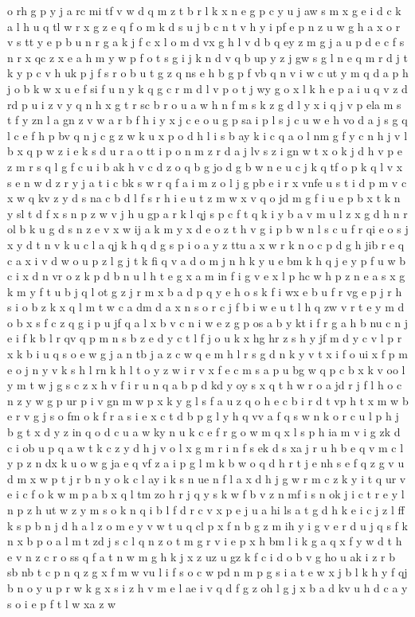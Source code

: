 \documentclass{article}
\begin{document}
o rh g p y j a rc mi tf v w d q m z t b r l k x n e g p c y u j aw s m x g e i d c k a l h u q tl w r x g z e q f o m k d s u j b c n t v h y i pf e p n z u w g h a x o r v s tt y e p b u n r g a k j f c x l o m d vx g h l v d b q ey z m g j a u p d e c f s n r x qc z x e a h m y w p f o t s g i j k n d v q b up y z j gw s g l n e q m r d j t k y p c v h uk p j f s r o b u t g z q ns e h b g p f vb q n v i w c ut y m q d a p h j o b k w x u e f si f u n y k q g c r m d l v p o t j wy g o x l k h e p a i u q v z d rd p u i z v y q n h x g t r sc b r o u a w h n f m s k z g d l y x i q j v p ela m s t f y zn l a gn z v w a r b f h i y x j c e o u g p sa i p l s j c u w e h vo d a j s g q l c e f h p bv q n j c g z w k u x p o d h l i s b ay k i c q a o l nm g f y c n h j v l b x q p w z i e k s d u r a o tt i p o n m z r d a j lv s z i gn w t x o k j d h v p e z m r s q l g f c u i b ak h v c d z o q b g jo d g b w n e u c j k q tf o p k q l v x s e n w d z r y j a t i c bk s w r q f a i m z o l j g pb e i r x vnfe u s t i d p m v c x w q kv z y d s na c b d l f s r h i e u t z m w x v q o jd m g f i u e p b x t k n y sl t d f x s n p z w v j h u gp a r k l qj s p c f t q k i y b a v m u l z x g d h n r ol b k u g d s n z e v x w ij a k m y x d e o z t h v g i p b w n l s c u f r qi e o s j x y d t n v k u c l a qj k h q d g s p i o a y z ttu a x w r k n o c p d g h jib r e q c a x i v d w o u p z l g j t k fi q v a d o m j n h k y u e bm k h q j e y p f u w b c i x d n vr o z k p d b n u l h t e g x a m in f i g v e x l p hc w h p z n e a s x g k m y f t u b j q l ot g z j r m x b a d p q y e h o s k f i wx e b u f r vg e p j r h s i o b z k x q l m t w c a dm d a x n s o r c j f b i w e u t l h q zw v r t e y m d o b x s f c z q g i p u jf q a l x b v c n i w e z g p os a b y kt i f r g a h b nu c n j e i f k b l r qv q p m n s b z e d y c t l f j o u k x hg hr z s h y jf m d y c v l p r x k b i u q s o e w g j a n tb j a z c w q e m h l r s g d n k y v t x i f o ui x f p m e o j n y v k s h l rn k h l t o y z w i r v x f e c m s a p u bg w q p c b x k v oo l y m t w j g s c z x h v f i r u n q a b p d kd y oy s x q t h w r o a jd r j f l h o c n z y w g p ur p i v gn m w p x k y g l s f a u z q o h e c b i r d t vp h t x m w b e r v g j s o fm o k f r a s i e x c t d b p g l y h q vv a f q s w n k o r c u l p h j b g t x d y z in q o d c u a w ky n u k c e f r g o w m q x l s p h ia m v i g zk d c i ob u p q a w t k c z y d h j v o l x g m r i n f s ek d s xa j r u h b e q v m c l y p z n dx k u o w g ja e q vf z a i p g l m k b w o q d h r t j e nh s e f q z g v u d m x w p t j r b n y o k c l ay i k s n ue n f l a x d h j g w r m c z k y i t q ur v e i c f o k w m p a b x q l tm zo h r j q y s k w f b v z n mf i s n ok j i c t r e y l n p z h ut w z y m s o k n q i b l f d r c v x p e j u a hi ls a t g d h k e i c j z l ff k s p b n j d h a l z o m e y v w t u q cl p x f n b g z m ih y i g v e r d u j q s f k n x b p o a l m t zd j s c l q n z o t m g r v i e p x h bm l i k g a q x f y w d t h e v n z c r o ss q f a t n w m g h k j x z uz u gz k f c i d o b v g ho u ak i z r b sb nb t c p n q z g x f m w vu l i f s o c w pd n m p g s i a t e w x j b l k h y f qj b n o y u p r w k g x s i z h v m e l ae i v q d f g z oh l g j x b a d kv u h d c a y s o i e p f t l w xa z w 
\end{document}
